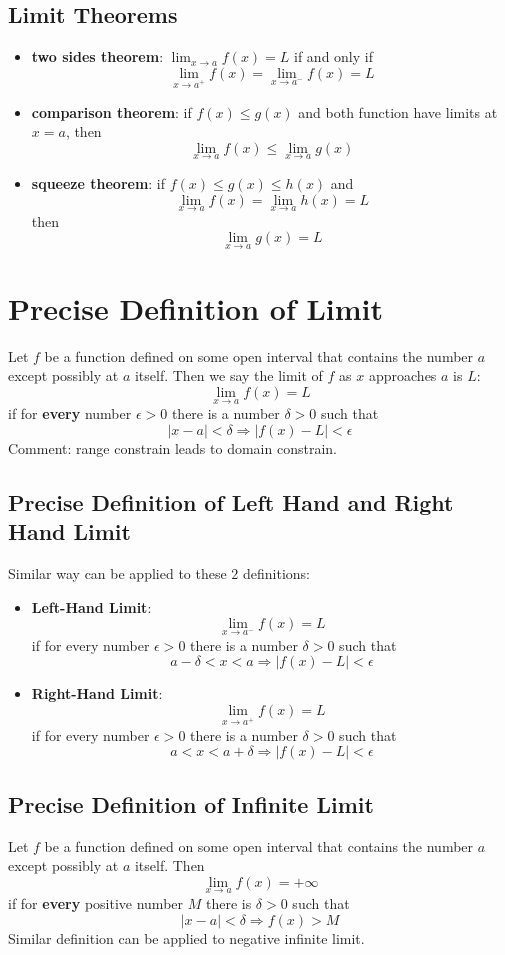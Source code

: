 \documentclass[10pt,a4paper,oneside]{article}
\begin{document}
\subsection{Limit Theorems}
\begin{itemize}
	\item \textbf{two sides theorem}: $\lim_{x \rightarrow a} f(x) = L$ if and only if
	\[
	\lim_{x \rightarrow a^{+}} f(x) = \lim_{x \rightarrow a^{-}} f(x) = L
	\]
	\item \textbf{comparison theorem}: if $f(x) \leq g(x)$ and both function have limits at $x = a$, then
	\[
	\lim_{x \rightarrow a} f(x) \leq \lim_{x \rightarrow a} g(x) 
	\]
	\item \textbf{squeeze theorem}: if $f(x) \leq g(x) \leq h(x)$ and
	\[
	\lim_{x \rightarrow a} f(x) = \lim_{x \rightarrow a} h(x) = L
	\]
	then
	\[
	\lim_{x \rightarrow a} g(x) = L
	\]
\end{itemize}

\section{Precise Definition of Limit}
Let $f$ be a function defined on some open interval that contains the number $a$ except possibly at $a$ itself. Then we say the limit of $f$ as $x$ approaches $a$ is $L$:
\[
\lim_{x \rightarrow a} f(x) = L
\]
if for \textbf{every} number $\epsilon>0$ there is a number $\delta>0$ such that
 \[
 |x-a| < \delta \Longrightarrow |f(x) - L| < \epsilon
 \]
 Comment: range constrain leads to domain constrain.

\subsection{Precise Definition of Left Hand and Right Hand Limit}
Similar way can be applied to these $2$ definitions:
\begin{itemize}
	\item \textbf{Left-Hand Limit}:
	\[
	\lim_{x \rightarrow a^{-}} f(x) = L 
	\]
	if for every number $\epsilon>0$ there is a number $\delta>0$ such that
	\[
    a- \delta < x < a \Longrightarrow |f(x) - L| < \epsilon
	\]
	\item \textbf{Right-Hand Limit}:
	\[
	\lim_{x \rightarrow a^{+}} f(x) = L 
	\]
	if for every number $\epsilon>0$ there is a number $\delta>0$ such that
	\[
	a < x < a + \delta  \Longrightarrow |f(x) - L| < \epsilon
	\]
\end{itemize}

\subsection{Precise Definition of Infinite Limit}
Let $f$ be a function defined on some open interval that contains the number $a$ except possibly at $a$ itself. Then
\[
\lim_{x \rightarrow a} f(x) = +\infty
\]
if for \textbf{every} positive number $M$ there is $\delta>0$ such that
\[
|x-a| < \delta \Longrightarrow f(x)>M
\]
Similar definition can be applied to negative infinite limit.
\end{document}
